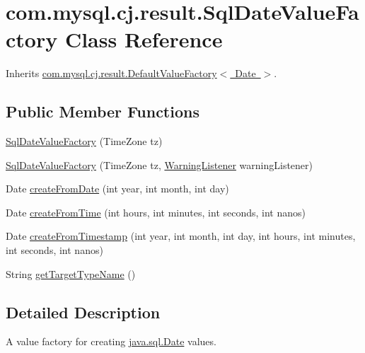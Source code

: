 \hypertarget{classcom_1_1mysql_1_1cj_1_1result_1_1_sql_date_value_factory}{}\section{com.\+mysql.\+cj.\+result.\+Sql\+Date\+Value\+Factory Class Reference}
\label{classcom_1_1mysql_1_1cj_1_1result_1_1_sql_date_value_factory}


Inherits \mbox{\hyperlink{classcom_1_1mysql_1_1cj_1_1result_1_1_default_value_factory}{com.\+mysql.\+cj.\+result.\+Default\+Value\+Factory$<$ Date $>$}}.

\subsection*{Public Member Functions}
\begin{DoxyCompactItemize}
\item 
\mbox{\hyperlink{classcom_1_1mysql_1_1cj_1_1result_1_1_sql_date_value_factory_afb89a4429b9fa7dd08b961e843940911}{Sql\+Date\+Value\+Factory}} (Time\+Zone tz)
\item 
\mbox{\hyperlink{classcom_1_1mysql_1_1cj_1_1result_1_1_sql_date_value_factory_aa8e2b06921ed081d8c6f4b608783700c}{Sql\+Date\+Value\+Factory}} (Time\+Zone tz, \mbox{\hyperlink{interfacecom_1_1mysql_1_1cj_1_1_warning_listener}{Warning\+Listener}} warning\+Listener)
\item 
Date \mbox{\hyperlink{classcom_1_1mysql_1_1cj_1_1result_1_1_sql_date_value_factory_a832addef031c4400a2a7bc8062436b50}{create\+From\+Date}} (int year, int month, int day)
\item 
Date \mbox{\hyperlink{classcom_1_1mysql_1_1cj_1_1result_1_1_sql_date_value_factory_a8b7ca7f9ccedd1f69a380afb5e3505c7}{create\+From\+Time}} (int hours, int minutes, int seconds, int nanos)
\item 
Date \mbox{\hyperlink{classcom_1_1mysql_1_1cj_1_1result_1_1_sql_date_value_factory_a2f9afd2aa491bdb58cc8ec47a83d8f08}{create\+From\+Timestamp}} (int year, int month, int day, int hours, int minutes, int seconds, int nanos)
\item 
String \mbox{\hyperlink{classcom_1_1mysql_1_1cj_1_1result_1_1_sql_date_value_factory_a30d4e2fdfddfca859625afbe4e56f2f4}{get\+Target\+Type\+Name}} ()
\end{DoxyCompactItemize}


\subsection{Detailed Description}
A value factory for creating \mbox{\hyperlink{}{java.\+sql.\+Date}} values. 

